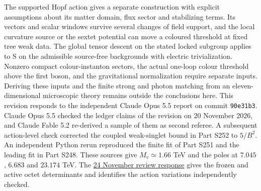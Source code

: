 \documentclass[aps,prd,reprint,onecolumn,nofootinbib,amsmath,amssymb]{revtex4-2}
\begin{document}
The supported Hopf action gives a separate construction with explicit assumptions about its matter domain, flux sector and stabilizing terms. Its vectors and scalar windows survive several changes of field support, and the local curvature source or the sextet potential can move a coloured threshold at fixed tree weak data. The global tensor descent on the stated locked subgroup applies to S on the admissible source-free backgrounds with electric trivialization. Nonzero compact colour-instanton sectors, the actual one-loop colour threshold above the first boson, and the gravitational normalization require separate inputs. Deriving these inputs and the finite strong and photon matching from an eleven-dimensional microscopic theory remains outside the conclusions here.
\smallskip
\noindent This revision responds to the independent Claude Opus 5.5 report on commit \texttt{90e31b3}. Claude Opus 5.5 checked the ledger claims of the revision on 20 November 2026, and Claude Fable 5.2 re-derived a sample of them as second referee. A subsequent action-level check corrected the coupled weak-singlet bound in Part S252 to $5/B^2$. An independent Python rerun reproduced the finite fit of Part S251 and the leading fit in Part S248. These sources give $M_v\simeq1.66$ TeV and the poles at $7.045$, $6.683$ and $23.174$ TeV. The \href{https://github.com/arivero/conneskk/blob/master/paper/NUMERICAL_CHECKS.md}{24 November review response} gives the frozen and active octet determinants and identifies the action variations independently checked.


\end{document}

